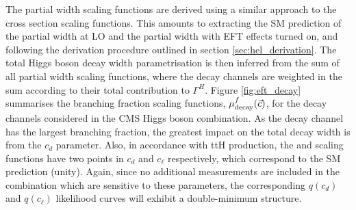 
The partial width scaling functions are derived using a similar approach to the cross section scaling functions. This amounts to extracting the SM prediction of the partial width at LO and the partial width with EFT effects turned on, and following the derivation procedure outlined in section \ref{sec:hel_derivation}. The total Higgs boson decay width parametrisation is then inferred from the sum of all partial width scaling functions, where the decay channels are weighted in the sum according to their total contribution to $\Gamma^{H}$. Figure \ref{fig:eft_decay} summarises the branching fraction scaling functions, $\mu_{\rm{decay}}^f(\vec{c})$, for the decay channels considered in the CMS Higgs boson combination. As the \Hbb decay channel has the largest branching fraction, the greatest impact on the total decay width is from the $c_d$ parameter. Also, in accordance with ttH production, the \Hbb and \Htautau scaling functions have two points in $c_d$ and $c_\ell$ respectively, which correspond to the SM prediction (unity). Again, since no additional measurements are included in the combination which are sensitive to these parameters, the corresponding $q(c_d)$ and $q(c_\ell)$ likelihood curves will exhibit a double-minimum structure.

